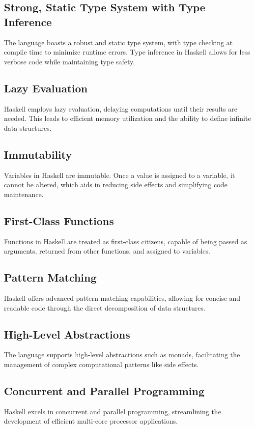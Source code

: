 \documentclass[a4paper, 10pt]{article}
\begin{document}
        \subsection{Strong, Static Type System with Type Inference}
            The language boasts a robust and static type system, with type checking at compile time to minimize runtime errors. Type inference in Haskell allows for less verbose code while maintaining type safety.

        \subsection{Lazy Evaluation}
            Haskell employs lazy evaluation, delaying computations until their results are needed. This leads to efficient memory utilization and the ability to define infinite data structures.

        \subsection{Immutability}
            Variables in Haskell are immutable. Once a value is assigned to a variable, it cannot be altered, which aids in reducing side effects and simplifying code maintenance.

        \subsection{First-Class Functions}
            Functions in Haskell are treated as first-class citizens, capable of being passed as arguments, returned from other functions, and assigned to variables.

        \subsection{Pattern Matching}
            Haskell offers advanced pattern matching capabilities, allowing for concise and readable code through the direct decomposition of data structures.

        \subsection{High-Level Abstractions}
            The language supports high-level abstractions such as monads, facilitating the management of complex computational patterns like side effects.

        \subsection{Concurrent and Parallel Programming}
            Haskell excels in concurrent and parallel programming, streamlining the development of efficient multi-core processor applications.
\end{document}
